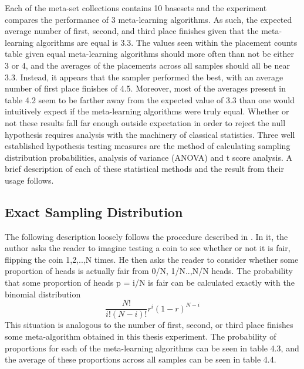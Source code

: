 Each of the meta-set collections contains 10 basesets and the experiment
compares the performance of 3 meta-learning algorithms. As such, the expected
average number of first, second, and third place finishes given that the
meta-learning algorithms are equal is 3.3. The values seen within the placement
counts table given equal meta-learning algorithms should more often than not be
either 3 or 4, and the averages of the placements across all samples should all
be near 3.3. Instead, it appears that the sampler performed the best,
with an average number of first place finishes of 4.5. Moreover, most of the
averages present in table 4.2 seem to be farther away from the expected value of
3.3 than one would intuitively expect if the meta-learning algorithms were
truly equal. Whether or not these results fall far enough outside
expectation in order to reject the null hypothesis requires analysis with the
machinery of classical statistics. Three well established hypothesis testing
measures are the method of calculating sampling distribution probabilities,
analysis of variance (ANOVA) and t score analysis. A brief description of each
of these statistical methods and the result from their usage follows.

\subsection{Exact Sampling Distribution}
The following description loosely follows the procedure described in \cite{Cohen}.
In it, the author asks the reader to imagine testing a coin to see whether or
not it is fair, flipping the coin 1,2,..,N times. He then asks the reader to
consider whether some proportion of heads is actually fair from 0/N, 1/N..,N/N
heads. The probability that some proportion of heads p = i/N is fair can be
calculated exactly with the binomial distribution
$$\frac{N!}{i!(N-i)!}r^{i}(1-r)^{N-i}$$
This situation is analogous to the number of first, second, or third place
finishes some meta-algorithm obtained in this thesis experiment. The probability
of proportions for each of the meta-learning algorithms can be seen in table 4.3,
and the average of these proportions across all samples can be seen in table 4.4.

